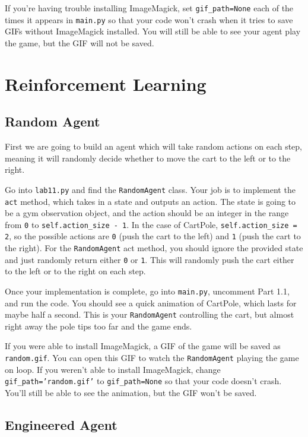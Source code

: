 \documentclass{article}
\begin{document}
If you're having trouble installing ImageMagick, set \texttt{gif\_path=None} each of the times it appears in \texttt{main.py} so that your code won't crash when it tries to save GIFs without ImageMagick installed. You will still be able to see your agent play the game, but the GIF will not be saved.

\section{Reinforcement Learning}

\subsection{Random Agent}

First we are going to build an agent which will take random actions on each step, meaning it will randomly decide whether to move the cart to the left or to the right.

Go into \texttt{lab11.py} and find the \texttt{RandomAgent} class. Your job is to implement the \texttt{act} method, which takes in a state and outputs an action. The state is going to be a gym observation object, and the action should be an integer in the range from \texttt{0} to \texttt{self.action\_size - 1}. In the case of CartPole, \texttt{self.action\_size = 2}, so the possible actions are \texttt{0} (push the cart to the left) and \texttt{1} (push the cart to the right). For the \texttt{RandomAgent} act method, you should ignore the provided state and just randomly return either \texttt{0} or \texttt{1}. This will randomly push the cart either to the left or to the right on each step.

Once your implementation is complete, go into \texttt{main.py}, uncomment Part 1.1, and run the code. You should see a quick animation of CartPole, which lasts for maybe half a second. This is your \texttt{RandomAgent} controlling the cart, but almost right away the pole tips too far and the game ends.

If you were able to install ImageMagick, a GIF of the game will be saved as \texttt{random.gif}. You can open this GIF to watch the \texttt{RandomAgent} playing the game on loop. If you weren't able to install ImageMagick, change \texttt{gif\_path='random.gif'} to \texttt{gif\_path=None} so that your code doesn't crash. You'll still be able to see the animation, but the GIF won't be saved.

\subsection{Engineered Agent}
\end{document}
